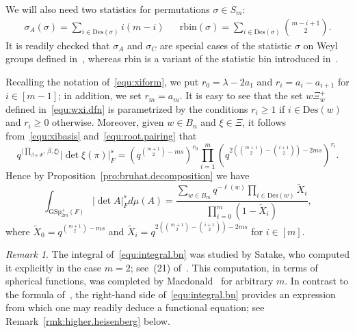 \documentclass[11pt,a4paper]{amsart}
\theoremstyle{plain}
\theoremstyle{remark}
\newtheorem{rem}[thm]{Remark}
\begin{document}
We will also need two statistics for permutations $\sigma \in S_m$:
$$ \begin{array}{lcr}
\displaystyle{\sigma_A(\sigma) = \sum_{i \in \mathrm{Des}(\sigma)} i(m-i)} & & \displaystyle{\mathrm{rbin}(\sigma) = \sum_{i \in \mathrm{Des}(\sigma)} \binom{m-i+1}{2}.} \end{array} $$
It is readily checked that $\sigma_A$ and $\sigma_C$ are special cases of the statistic $\sigma$ on Weyl groups defined in~\cite{StembridgeWaugh/98}, whereas $\mathrm{rbin}$ is a variant of the statistic $\mathrm{bin}$ introduced in~\cite{BrightSavage/10}.

Recalling the notation of~\eqref{equ:xiform}, we put $r_0 = \lambda - 2a_1$ and $r_i = a_i - a_{i+1}$ for $i \in [m-1]$; in addition, we set $r_m = a_m$.  It is easy to see that
the set $w \Xi^+_w$ defined in~\eqref{equ:wxi.dfn} is parametrized by the conditions $r_i \geq 1$ if $i \in \mathrm{Des}(w)$ and $r_i \geq 0$ otherwise.  Moreover, given $w \in B_n$ and $\xi \in \Xi$, it follows from~\eqref{equ:xibasis} and~\eqref{equ:root.pairing} that
\begin{equation*}
q^{\langle \prod_{\beta \in \Phi^+} \beta, \xi \rangle} | \det \xi(\pi) |^s_F = \left( q^{\binom{m+1}{2} - ms} \right)^{r_0} \prod_{i = 1}^m \left( q^{2 \left( \binom{m+1}{2} - \binom{i+1}{2} \right) - 2ms} \right)^{r_i}.
\end{equation*}
Hence by Proposition~\ref{pro:bruhat.decomposition} we have
\begin{equation} \label{equ:integral.bn}
\int_{\mathrm{GSp}_{2m}^+(F)} | \det A |_{F}^{s} d \mu(A) = 
\frac{\sum_{w \in B_m} q^{- \ell(w)} \prod_{i \in \mathrm{Des}(w)} \widetilde{X}_i}{\prod_{i = 0}^m (1 - \widetilde{X}_i)},
\end{equation}
where $\widetilde{X}_0 = q^{\binom{m+1}{2} - ms}$ and $\widetilde{X}_i = q^{2 \left( \binom{m+1}{2} - \binom{i+1}{2} \right) - 2ms}$ for $i \in [m]$.

\begin{rem}
The integral of~\eqref{equ:integral.bn} was studied by Satake, who computed it explicitly in the case $m = 2$; see~(21) of~\cite[Appendix I]{Satake/63}.  This computation, in terms of spherical functions, was completed by Macdonald~\cite[V.(5.4)]{Macdonald/95} for arbitrary $m$.  In contrast to the formula of~\cite{Macdonald/95}, the right-hand side of~\eqref{equ:integral.bn} provides an expression from which one may readily deduce a functional equation; see Remark~\ref{rmk:higher.heisenberg} below.  
\end{rem}
\end{document}
